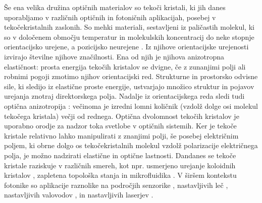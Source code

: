\documentclass[a4paper,11pt]{article}
\begin{document}
Še ena velika družina optičnih materialov so tekoči kristali, ki jih danes uporabljamo v različnih optičnih in fotoničnih aplikacijah, posebej v tekočekristalnih zaslonih. 
So mehki materiali, sestavljeni iz paličastih molekul, ki so v določenem območju temperatur in molekulskih koncentracij do neke stopnje orientacijsko urejene, a pozicijsko neurejene \cite{degennes}.
Iz njihove orientacijske urejenosti izvirajo številne njihove značilnosti. 
Ena od njih je njihova anizotropna elastičnost: prosta energija tekočih kristalov se dvigne, če z zunanjimi polji ali robnimi pogoji zmotimo njihov orientacijski red. 
Strukturne in prostorsko odvisne sile, ki sledijo iz elastične proste energije, ustvarjajo množico struktur in pojavov urejanja znotraj direktorskega polja.
Nadalje iz orientacijskega reda sledi tudi optična anizotropija \cite{hecht-optics}: večinoma je izredni lomni količnik (vzdolž dolge osi molekul tekočega kristala) večji od rednega. 
Optična dvolomnost tekočih kristalov je uporabno orodje za nadzor toka svetlobe v optičnih sistemih. 
Ker je tekoče kristale relativno lahko manipulirati z znanjimi polji, še posebej električnim poljem, ki obrne dolgo os tekočekristalnih molekul vzdolž polarizacije električnega polja, je možno nadzirati elastične in optične lastnosti. 
Dandanes se tekoče kristale raziskuje v različnih smereh, kot npr. usmerjeno urejanje koloidnih kristalov \cite{zumer-2006-assembly,musevic-2013-assembly}, zapletena topološka stanja \cite{musevic-2011-knots,smalyukh-2014-knots,zumer-2014-knots} in mikrofluidika \cite{yeomans-2013-lc-microfluidics}.
V širšem kontekstu fotonike so aplikacije raznolike na področjih senzorike \cite{abbott-2013-sensing}, nastavljivih leč \cite{neyts-2017-lensing,lin-2011-lensing}, nastavljivih valovodov \cite{kitzerow-2014-fibres}, in nastavljivih laserjev \cite{humar-2016-lasing}.


\end{document}
